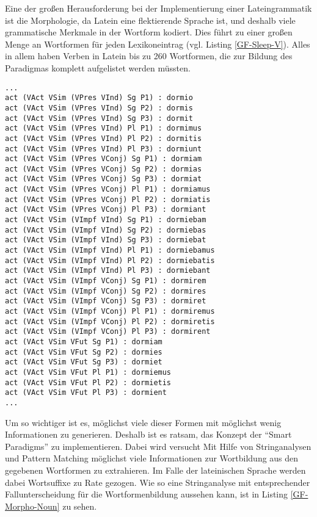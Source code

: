 Eine der großen Herausforderung bei der Implementierung einer Lateingrammatik ist die Morphologie, da Latein eine flektierende Sprache ist, und deshalb viele grammatische Merkmale in der Wortform kodiert. Dies führt zu einer großen Menge an Wortformen für jeden Lexikoneintrag (vgl. Listing \ref{GF-Sleep-V}). Alles in allem haben Verben in Latein bis zu 260 Wortformen, die zur Bildung des Paradigmas komplett aufgelistet werden müssten. \par
\begin{lstlisting}[float=h!tp,caption={Ausschnitt aus dem Paradigma des Verbs \texttt{sleep\_V}},label={GF-Sleep-V},basicstyle=\small]
...
act (VAct VSim (VPres VInd) Sg P1) : dormio
act (VAct VSim (VPres VInd) Sg P2) : dormis
act (VAct VSim (VPres VInd) Sg P3) : dormit
act (VAct VSim (VPres VInd) Pl P1) : dormimus
act (VAct VSim (VPres VInd) Pl P2) : dormitis
act (VAct VSim (VPres VInd) Pl P3) : dormiunt
act (VAct VSim (VPres VConj) Sg P1) : dormiam
act (VAct VSim (VPres VConj) Sg P2) : dormias
act (VAct VSim (VPres VConj) Sg P3) : dormiat
act (VAct VSim (VPres VConj) Pl P1) : dormiamus
act (VAct VSim (VPres VConj) Pl P2) : dormiatis
act (VAct VSim (VPres VConj) Pl P3) : dormiant
act (VAct VSim (VImpf VInd) Sg P1) : dormiebam
act (VAct VSim (VImpf VInd) Sg P2) : dormiebas
act (VAct VSim (VImpf VInd) Sg P3) : dormiebat
act (VAct VSim (VImpf VInd) Pl P1) : dormiebamus
act (VAct VSim (VImpf VInd) Pl P2) : dormiebatis
act (VAct VSim (VImpf VInd) Pl P3) : dormiebant
act (VAct VSim (VImpf VConj) Sg P1) : dormirem
act (VAct VSim (VImpf VConj) Sg P2) : dormires
act (VAct VSim (VImpf VConj) Sg P3) : dormiret
act (VAct VSim (VImpf VConj) Pl P1) : dormiremus
act (VAct VSim (VImpf VConj) Pl P2) : dormiretis
act (VAct VSim (VImpf VConj) Pl P3) : dormirent
act (VAct VSim VFut Sg P1) : dormiam
act (VAct VSim VFut Sg P2) : dormies
act (VAct VSim VFut Sg P3) : dormiet
act (VAct VSim VFut Pl P1) : dormiemus
act (VAct VSim VFut Pl P2) : dormietis
act (VAct VSim VFut Pl P3) : dormient
...
\end{lstlisting}
Um so wichtiger ist es, möglichst viele dieser Formen mit möglichst wenig Informationen zu generieren. Deshalb ist es ratsam, das Konzept der "`Smart Paradigms"' zu implementieren. Dabei wird versucht Mit Hilfe von Stringanalysen und Pattern Matching möglichst viele Informationen zur Wortbildung aus den gegebenen Wortformen zu extrahieren. Im Falle der lateinischen Sprache werden dabei Wortsuffixe zu Rate gezogen. Wie so eine Stringanalyse mit entsprechender Fallunterscheidung für die Wortformenbildung aussehen kann, ist in Listing \ref{GF-Morpho-Noun} zu sehen.\par
